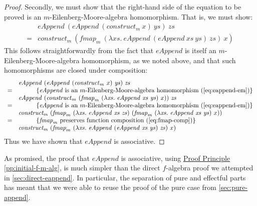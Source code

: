 \documentclass{jfp1}
\newcommand{\eqAnnotationS}[1]{\hspace{1cm}\left\{\textrm{#1}\right\}}
\newcommand{\proofprinref}[1]{\hyperref[#1]{Proof Principle \ref*{#1}}}
\begin{document}
\begin{proof}
  Secondly, we must show that the right-hand side of the equation to
  be proved is an $m$-Eilenberg-Moore-algebra homomorphism. That is,
  we must show:
  \begin{displaymath}
    \begin{array}{cl}
      &\mathit{eAppend}~(\mathit{eAppend}~(\mathit{construct}_m~x)~\mathit{ys})~\mathit{zs} \\
      =&\mathit{construct}_m~(\mathit{fmap}_m~(\lambda \mathit{xs}.~\mathit{eAppend}~(\mathit{eAppend}~\mathit{xs}~\mathit{ys})~\mathit{zs})~x)
    \end{array}
  \end{displaymath}
  This follows straightforwardly from the fact that $\mathit{eAppend}$
  is itself an $m$-Eilenberg-Moore-algebra homomorphism, as we noted
  above, and that such homomorphisms are closed under composition:
  \begin{displaymath}
    \begin{array}{cl}
      & \mathit{eAppend}~(\mathit{eAppend}~(\mathit{construct}_m~x)~\mathit{ys})~\mathit{zs} \\
      =&\eqAnnotationS{$\mathit{eAppend}$ is an $m$-Eilenberg-Moore-algebra homomorphism (\autoref{eq:eappend-em})} \\
      & \mathit{eAppend}~(\mathit{construct}_m~(\mathit{fmap}_m~(\lambda \mathit{xs}.~\mathit{eAppend}~\mathit{xs}~\mathit{ys})~x))~\mathit{zs} \\
      =&\eqAnnotationS{$\mathit{eAppend}$ is an $m$-Eilenberg-Moore-algebra homomorphism (\autoref{eq:eappend-em})} \\
      & \mathit{construct_m}~(\mathit{fmap}_m~(\lambda \mathit{xs}.~\mathit{eAppend}~\mathit{xs}~\mathit{zs})~(\mathit{fmap}_m~(\lambda \mathit{xs}.~\mathit{eAppend}~\mathit{xs}~\mathit{ys})~x)) \\
      =&\eqAnnotationS{$\mathit{fmap}_m$ preserves function composition (\autoref{eq:fmap-comp})} \\
      & \mathit{construct_m}~(\mathit{fmap}_m~(\lambda \mathit{xs}.~\mathit{eAppend}~(\mathit{eAppend}~\mathit{xs}~\mathit{ys})~\mathit{zs})~x)
    \end{array}
  \end{displaymath}
  Thus we have shown that $\mathit{eAppend}$ is associative.
\end{proof}
As promised, the proof that $\mathit{eAppend}$ is associative, using
\proofprinref{pp:initial-f-m-alg}, is much simpler than the direct
$f$-algebra proof we attempted in \autoref{sec:direct-eappend}. In
particular, the separation of pure and effectful parts has meant that
we were able to reuse the proof of the pure case from
\autoref{sec:pure-append}.
\end{document}
